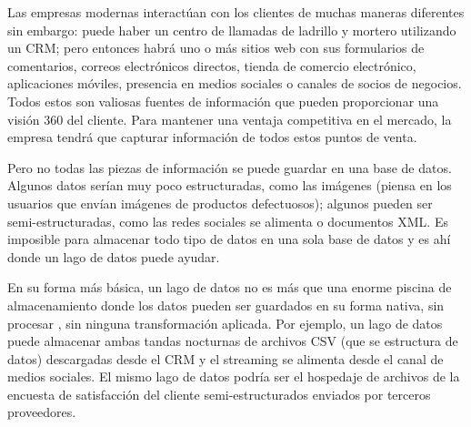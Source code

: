 \documentclass[preprint,12pt]{elsarticle}
\begin{document}
\begin{itemize}
Las empresas modernas interactúan con los clientes de muchas maneras diferentes sin embargo: puede haber un centro de llamadas de ladrillo y mortero utilizando un CRM; pero entonces habrá uno o más sitios web con sus formularios de comentarios, correos electrónicos directos, tienda de comercio electrónico, aplicaciones móviles, presencia en medios sociales o canales de socios de negocios. Todos estos son valiosas fuentes de información que pueden proporcionar una visión 360 del cliente. Para mantener una ventaja competitiva en el mercado, la empresa tendrá que capturar información de todos estos puntos de venta.

Pero no todas las piezas de información se puede guardar en una base de datos. Algunos datos serían muy poco estructuradas, como las imágenes (piensa en los usuarios que envían imágenes de productos defectuosos); algunos pueden ser semi-estructuradas, como las redes sociales se alimenta o documentos XML. Es imposible para almacenar todo tipo de datos en una sola base de datos y es ahí donde un lago de datos puede ayudar.

En su forma más básica, un lago de datos no es más que una enorme piscina de almacenamiento donde los datos pueden ser guardados en su forma nativa, sin procesar , sin ninguna transformación aplicada. Por ejemplo, un lago de datos puede almacenar ambas tandas nocturnas de archivos CSV (que se estructura de datos) descargadas desde el CRM y el streaming se alimenta desde el canal de medios sociales. El mismo lago de datos podría ser el hospedaje de archivos de la encuesta de satisfacción del cliente semi-estructurados enviados por terceros proveedores.

\end{itemize}
\end{document}
